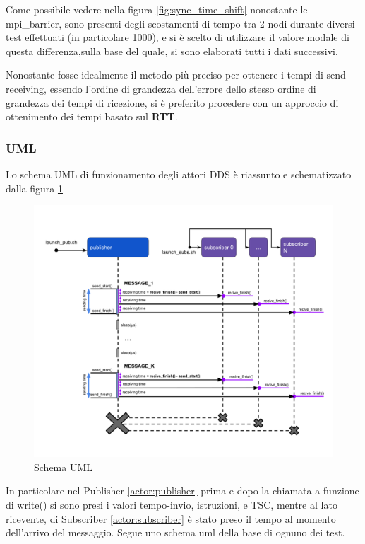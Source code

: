 Come possibile vedere nella figura \ref{fig:sync_time_shift} nonostante le mpi\_barrier, sono presenti degli scostamenti di tempo tra 2 nodi durante diversi test effettuati (in particolare 1000), e si è scelto di utilizzare il valore modale di questa differenza,sulla base del quale, si sono elaborati tutti i dati successivi.

Nonostante fosse idealmente il metodo più preciso per ottenere i tempi di send-receiving, essendo l'ordine di grandezza dell'errore dello stesso ordine di grandezza dei tempi di ricezione, si è preferito procedere con un approccio di ottenimento dei tempi basato sul \textbf{RTT}.


\subsubsection{UML}
Lo schema UML di funzionamento degli attori DDS è riassunto e schematizzato dalla figura \ref{fig:uml}
\begin{figure}[H]
    \centering
    \includegraphics[width=\textwidth]{./img/umel-send-receive.png}
    \caption{Schema UML} %
    \label{fig:uml}
\end{figure}

In particolare nel Publisher \ref{actor:publisher} prima e dopo la chiamata a funzione di write() %
si sono presi i valori tempo-invio, istruzioni, e TSC, mentre al lato ricevente, di Subscriber \ref{actor:subscriber} è stato preso il tempo al momento dell'arrivo del messaggio. Segue uno schema uml della base di ognuno dei test.




